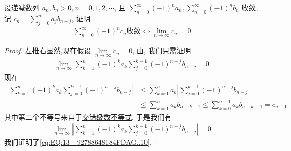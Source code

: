 \documentclass[../../main.tex]{subfiles}%
\begin{document}
\begin{example}
设递减数列 $a_n, b_n > 0, n = 0, 1, 2, \cdots$, 且 $\sum\limits_{n=0}^{\infty} (-1)^n a_n, \sum\limits_{n=0}^{\infty} (-1)^n b_n$ 收敛, 记 $c_n = \sum\limits_{j=0}^{n} a_j b_{n-j}$, 证明
\begin{align}
\sum\limits_{n=0}^{\infty} (-1)^n c_n \text{收敛} \iff \lim\limits_{n\to\infty} c_n = 0
\label{eq:EQ:13---92788648184FDAG..10}
\end{align}
\end{example}
\begin{proof}
左推右显然,现在假设 $\lim\limits_{n\to\infty} c_n = 0$, 由, 我们只需证明
\begin{align*}
\lim\limits_{n\to\infty} \sum\limits_{k=1}^{n} (-1)^k a_k \sum\limits_{j=0}^{k-1} (-1)^{n-j} b_{n-j} = 0
\end{align*}
现在
\begin{align*}
\left| \sum\limits_{k=1}^{n} (-1)^k a_k \sum\limits_{j=0}^{k-1} (-1)^{n-j} b_{n-j} \right| &\leqslant \sum\limits_{k=1}^{n} a_k \left| \sum\limits_{j=0}^{k-1} (-1)^{n-j} b_{n-j} \right| \\
&\leqslant \sum\limits_{k=1}^{n} a_k b_{n - k + 1} \leqslant \sum\limits_{k=0}^{n+1} a_k b_{n - k + 1} = c_{n+1}
\end{align*}
其中第二个不等号来自于\hyperref[theorem:交错级数不等式]{交错级数不等式}. 于是我们有
\begin{align*}
\lim\limits_{n\to\infty} \left| \sum\limits_{k=1}^{n} (-1)^k a_k \sum\limits_{j=0}^{k-1} (-1)^{n-j} b_{n-j} \right| = 0
\end{align*}
我们证明了\eqref{eq:EQ:13---92788648184FDAG..10}.
\end{proof}
\end{document}
